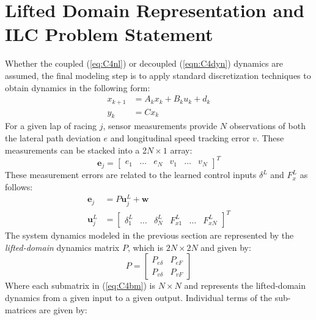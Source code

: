 \newpage
\section{Lifted Domain Representation and ILC \newline Problem Statement}
\label{sec:liftedD}
Whether the coupled (\ref{eq:C4nl}) or decoupled (\ref{eqn:C4dyn}) dynamics are assumed, the
final modeling step is to apply standard discretization techniques to obtain dynamics in the following form:
\begin{align}
\label{C4ad}
x_{k+1} &= A_kx_k + B_ku_k + d_k \\
y_{k}   &= Cx_k
\end{align}
For a given lap of racing $j$, sensor measurements provide $N$ observations of both the lateral path deviation $e$ and longitudinal
speed tracking error $v$. These measurements can be stacked into a 2$N \times 1$ array: 
\begin{equation}
\mathbf{e}_j = \begin{bmatrix} e_1 & \hdots & e_N & v_1 & \hdots & v_N \end{bmatrix}^T
\end{equation} 
These measurement errors are related to the learned control inputs $\delta^L$ and $F^L_x$ as follows: 
\begin{align}
\label{eq:liftedDomain}
\mathbf{e}_j &= P\mathbf{u}^L_j + \mathbf{w} \\
\mathbf{u}^L_j &= \begin{bmatrix} \delta^L_1 & \hdots & \delta^L_N & F^L_{x1} & \hdots & F^L_{xN} \end{bmatrix}^T
\end{align}
The system dynamics modeled in the previous section are represented by the \textit{lifted-domain} dynamics matrix $P$,
which is $\mathrm{2}N \times \mathrm{2}N$ and given by:
\begin{equation}
\label{eq:C4bm}
P=\left[
\begin{array}{c|c}
P_{e\delta} & P_{eF} \\ \hline
P_{v\delta} & P_{vF} 
\end{array}\right]
\end{equation}
Where each submatrix in (\ref{eq:C4bm}) is $N \times N$ and represents the lifted-domain dynamics from a given input to a given output. 
Individual terms of the sub-matrices are given by:

